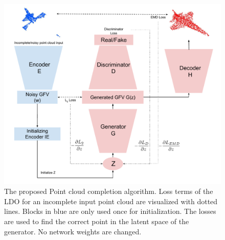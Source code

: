 \documentclass[10pt,twocolumn,letterpaper]{article}
\begin{document}
\begin{figure}
\begin{center}
\includegraphics[width=1\linewidth]{framework_with_init_enc.pdf}
\end{center}
   \caption{The proposed Point cloud completion algorithm. Loss terms of the LDO for an incomplete input point cloud are visualized with dotted lines. Blocks in blue are only used once for initialization. The losses are used to find the correct point in the latent space of the generator. No network weights are changed.}
\label{fig:ae}
\end{figure}
\end{document}

